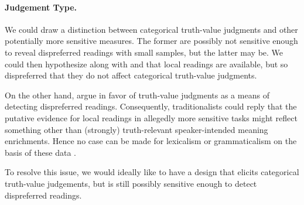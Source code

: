 \documentclass[fleqn,reqno,10pt]{article}
\begin{document}
\paragraph{Judgement Type.} We could draw a distinction between
categorical truth-value judgments and other potentially more sensitive
measures. The former are possibly not sensitive enough to reveal
dispreferred readings with small samples, but the latter may be. We
could then hypothesize along with
\citeauthor{CliftonDube2010:Embedded-Implic} and
\citeauthor{ChemlaSpector2010:Experimental-Ev} that local readings are
available, but so dispreferred that they do not affect categorical
truth-value judgments.

On the other hand, \citet{Crain1998} argue in favor of truth-value
judgments as a means of detecting dispreferred readings. Consequently,
traditionalists could reply that the putative evidence for local
readings in allegedly more sensitive tasks might reflect something
other than (strongly) truth-relevant speaker-intended meaning
enrichments. Hence no case can be made for lexicalism or
grammaticalism on the basis of these data \citep[see][for arguments
along these
lines]{GeurtsTielvan-Tiel2013:Embedded-Scalar,Tielvan-Tiel2014:Quantity-Matter,Tielvan-Tiel2012:Embedded-Scalar}.

To resolve this issue, we would ideally like to have a design that
elicits categorical truth-value judgements, but is still possibly
sensitive enough to detect dispreferred readings.
\end{document}

